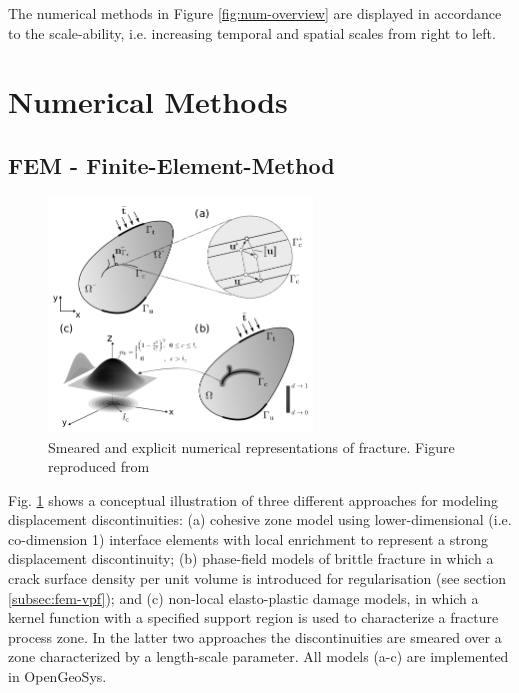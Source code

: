 The numerical methods in Figure \ref{fig:num-overview} are displayed in accordance to the scale-ability, i.e. increasing temporal and spatial scales from right to left.


\section{Numerical Methods}




\subsection*{FEM - Finite-Element-Method}
\begin{figure}
\centering
\includegraphics[width=7cm]{figures/Schematic_figure_LIE_PF_NLD}
\caption{Smeared and explicit numerical representations of fracture. Figure reproduced from~\cite{Yoshioka2019}}
\label{fig:ogsfem-overview}
\end{figure}
Fig. \ref{fig:ogsfem-overview} shows a conceptual illustration of three different approaches for modeling displacement discontinuities: (a) cohesive zone model using lower-dimensional (i.e. co-dimension 1) interface elements with local enrichment to represent a strong displacement discontinuity; (b) phase-field models of brittle fracture in which a crack surface density per unit volume is introduced for regularisation (see section \ref{subsec:fem-vpf}); and (c) non-local elasto-plastic damage models, in which a kernel function with a specified support region is used to characterize a fracture process zone. In the latter two approaches the discontinuities are smeared over a zone characterized by a length-scale parameter. All models (a-c) are implemented in OpenGeoSys.

